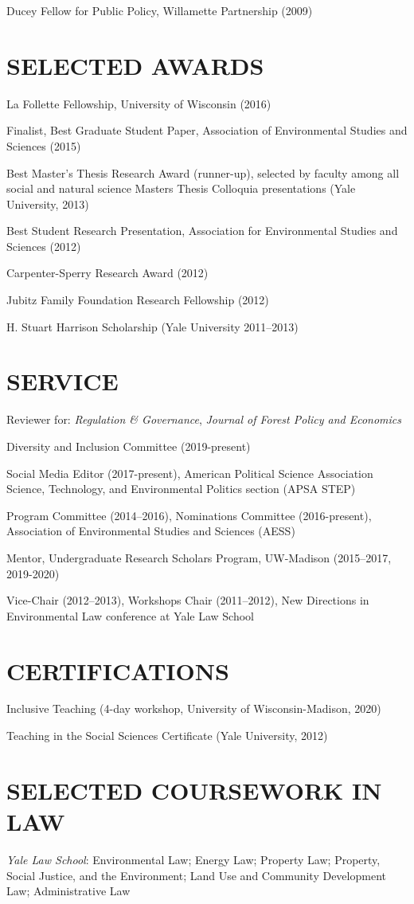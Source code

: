 \documentclass[11pt,]{article}
\begin{document}
Ducey Fellow for Public Policy, Willamette Partnership (2009)

\hypertarget{selected-awards}{%
\section{SELECTED AWARDS}\label{selected-awards}}

La Follette Fellowship, University of Wisconsin (2016)

Finalist, Best Graduate Student Paper, Association of Environmental
Studies and Sciences (2015)

Best Master's Thesis Research Award (runner-up), selected by faculty
among all social and natural science Masters Thesis Colloquia
presentations (Yale University, 2013)

Best Student Research Presentation, Association for Environmental
Studies and Sciences (2012)

Carpenter-Sperry Research Award (2012)

Jubitz Family Foundation Research Fellowship (2012)

H. Stuart Harrison Scholarship (Yale University 2011--2013)

\hypertarget{service}{%
\section{SERVICE}\label{service}}

Reviewer for: \emph{Regulation \& Governance}, \emph{Journal of Forest
Policy and Economics}

Diversity and Inclusion Committee (2019-present)

Social Media Editor (2017-present), American Political Science
Association Science, Technology, and Environmental Politics section
(APSA STEP)

Program Committee (2014--2016), Nominations Committee (2016-present),
Association of Environmental Studies and Sciences (AESS)

Mentor, Undergraduate Research Scholars Program, UW-Madison (2015--2017,
2019-2020)

Vice-Chair (2012--2013), Workshops Chair (2011--2012), New Directions in
Environmental Law conference at Yale Law School

\hypertarget{certifications}{%
\section{CERTIFICATIONS}\label{certifications}}

Inclusive Teaching (4-day workshop, University of Wisconsin-Madison,
2020)

Teaching in the Social Sciences Certificate (Yale University, 2012)

\hypertarget{selected-coursework-in-law}{%
\section{SELECTED COURSEWORK IN LAW}\label{selected-coursework-in-law}}

\emph{Yale Law School}: Environmental Law; Energy Law; Property Law;
Property, Social Justice, and the Environment; Land Use and Community
Development Law; Administrative Law
\end{document}
